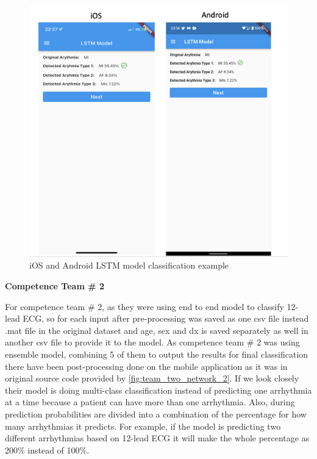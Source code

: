 \begin{figure}[H]
\centering
\includegraphics[scale=0.4]{img/lstm_deployment.png}
\caption{iOS and Android LSTM model classification example}
\label{dnn_deloyment}
\end{figure}

\textbf{Competence Team \# 2}

For competence team \# 2, as they were using end to end model to classify 12-lead ECG, so for each input after pre-processing was saved as one csv file instead .mat file in the original dataset and age, sex and dx is saved separately as well in another csv file to provide it to the model. As competence team \# 2 was using ensemble model, combining 5 of them to output the results for final classification there have been post-processing done on the mobile application as it was in original source code provided by \ref{fig:team_two_network_2}. If we look closely their model is doing multi-class classification instead of predicting one arrhythmia at a time because a patient can have more than one arrhythmia. Also, during prediction probabilities are divided into a combination of the percentage for how many arrhythmias it predicts. For example, if the model is predicting two different arrhythmias based on 12-lead ECG it will make the whole percentage as 200\% instead of 100\%. 

